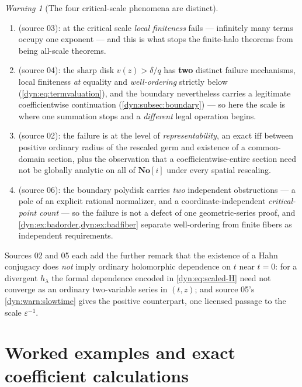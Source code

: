 \documentclass[11pt,letterpaper]{article}
\theoremstyle{definition}
\theoremstyle{remark}
\newtheorem{warning}[warning]{Warning}
\newcommand{\No}{\mathbf{No}}
\newcommand{\eps}{\varepsilon}
\numberwithin{equation}{section}
\begin{document}
\begin{warning}[The four critical-scale phenomena are distinct]
\label{dyn:warn:fourscales}
\begin{enumerate}[label=(\arabic*)]
\item {} (source 03): at the critical scale
\emph{local finiteness} fails --- infinitely many terms occupy one exponent
--- and this is what stops the finite-halo theorems from being all-scale
theorems.
\item {} (source 04): the sharp disk
$v(z)>\delta/q$ has \textbf{two} distinct failure mechanisms, local
finiteness \emph{at} equality and \emph{well-ordering} strictly below
(\eqref{dyn:eq:termvaluation}), and the boundary nevertheless carries a
legitimate coefficientwise continuation
(\cref{dyn:subsec:boundary}) --- so here the scale is where one summation
stops and a \emph{different} legal operation begins.
\item {} (source 02): the failure is at the level of
\emph{representability}, an exact iff between positive ordinary radius of
the rescaled germ and existence of a common-domain section, plus the
observation that a coefficientwise-entire section need not be globally
analytic on all of $\No[i]$ under every spatial rescaling.
\item {} (source 06): the boundary polydisk carries
\emph{two} independent obstructions --- a pole of an explicit rational
normalizer, and a coordinate-independent \emph{critical-point count} --- so
the failure is not a defect of one geometric-series proof, and
\cref{dyn:ex:badorder,dyn:ex:badfiber} separate well-ordering from finite
fibers as independent requirements.
\end{enumerate}
Sources 02 and 05 each add the further remark that the existence of a Hahn
conjugacy does \emph{not} imply ordinary holomorphic dependence on $t$ near
$t=0$: for a divergent $h_\lambda$ the formal dependence encoded in
\eqref{dyn:eq:scaled-H} need not converge as an ordinary two-variable
series in $(t,z)$; and source 05's \cref{dyn:warn:slowtime} gives the
positive counterpart, one licensed passage to the scale $\eps^{-1}$.
\end{warning}

\section{Worked examples and exact coefficient calculations}
\label{dyn:sec:examples}
\end{document}
